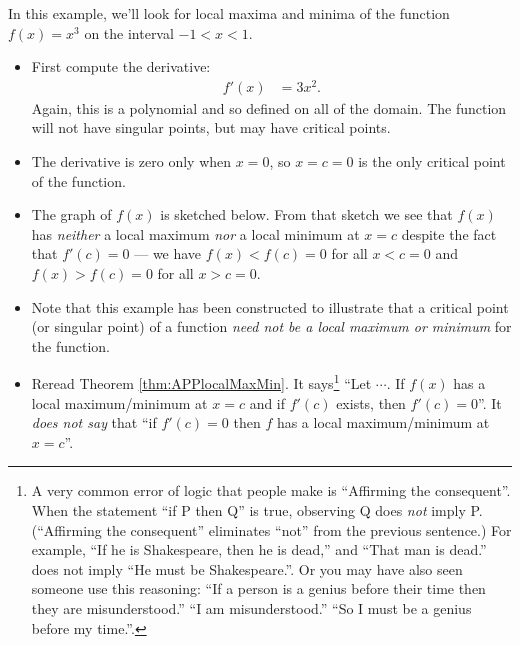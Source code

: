 \begin{eg}\label{eg:localMinMaxB}
In this example, we'll look for local maxima and minima of the function
$f(x) = x^3$ on the interval $-1 < x < 1$.
\begin{itemize}
 \item First compute the derivative:
\begin{align*}
  f'(x) &= 3x^2.
\end{align*}
Again, this is a polynomial and so defined on all of the domain. The function
will not have singular points, but may have critical points.

\item The derivative is zero only when $x=0$, so $x=c=0$ is the only critical
point of the function.
\item The graph of $f(x)$ is sketched below. From that sketch we see that $f(x)$
has \emph{neither} a local maximum \emph{nor} a local minimum at $x=c$ despite
the fact that $f'(c)=0$ --- we have $f(x)<f(c)=0$ for all $x<c=0$ and
$f(x)>f(c)=0$ for all $x>c=0$.
%
\item Note that this example has been constructed to illustrate that a critical
point (or singular point) of a function \emph{need not be a local maximum or
minimum} for the function.
\item Reread Theorem \ref{thm:APPlocalMaxMin}. It says\footnote{A very common
error of logic that people make is ``Affirming the consequent''.
When the statement ``if P then Q'' is true, observing Q does \emph{not} imply P. 
(``Affirming the consequent'' eliminates ``not'' from the previous sentence.) For example, ``If he is Shakespeare, then he
is dead,'' and ``That man is dead.'' does not imply ``He must be Shakespeare.''. Or you may have also 
seen someone use this reasoning: ``If a person is a genius before their time 
then they are misunderstood.'' ``I am misunderstood.'' ``So I must be a genius before my time.''.}
``Let $\cdots$. If $f(x)$ has a local maximum/minimum at $x=c$ and if $f'(c)$ exists, then $f'(c)=0$''. It \emph{does not say} that ``if $f'(c)=0$ then $f$
has a local maximum/minimum at $x=c$''.
\end{itemize}
\end{eg}\goodbreak


